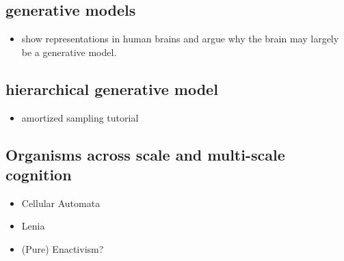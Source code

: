 \subsection{generative models}

\begin{itemize}
    \item show representations in human brains and argue why the brain may largely be a generative model. 
\end{itemize}



\subsection{hierarchical generative model}
\begin{itemize}
    \item amortized sampling tutorial
\end{itemize}

\subsection{Organisms across scale and multi-scale cognition}

\begin{itemize}
    \item Cellular Automata
    \item Lenia
    \item (Pure) Enactivism?
\end{itemize}


